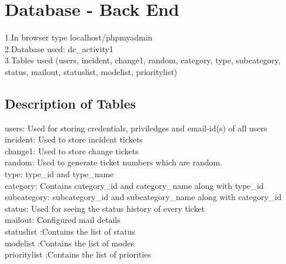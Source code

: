 \documentclass{article}
\begin{document}
\section{Database - Back End}
1.In browser type localhost/phpmyadmin\\
2.Database used: dc\_activity1\\
3.Tables used (users, incident, change1, random, category, type, subcategory, status, mailout, statuslist, modelist, prioritylist)
\subsection{Description of Tables}
users: Used for storing credentials, priviledges and email-id(s) of all users\\
incident: Used to store incident tickets\\
change1: Used to store change tickets\\
random: Used to generate ticket numbers which are random.\\
type: type\_id and type\_name\\
category: Contains category\_id and category\_name along with type\_id\\
subcategory: subcategory\_id and subcategory\_name along with category\_id\\
status: Used for seeing the status history of every ticket\\
mailout: Configured mail details\\
statuslist :Contains the list of status\\
modelist :Contains the list of modes\\
prioritylist :Contains the list of priorities
\end{document}

